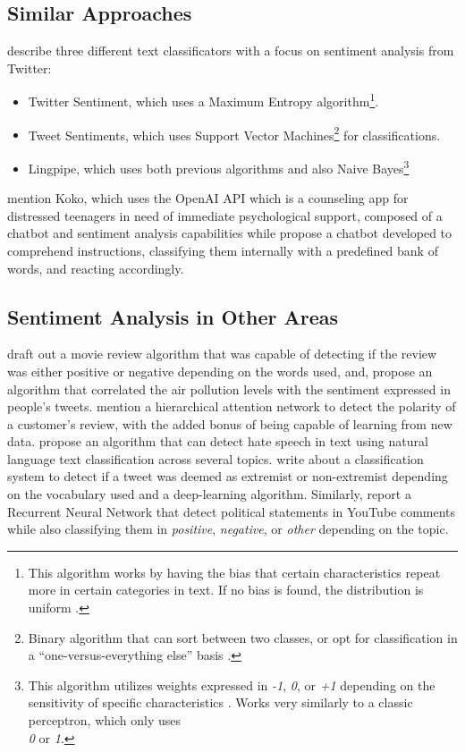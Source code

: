 \documentclass[review]{elsarticle} %
\begin{document}
\subsection{Similar Approaches}
\citet{rf10} describe three different text classificators with a focus on sentiment analysis from Twitter:\\ 
\begin{itemize}
\item Twitter Sentiment, which uses a Maximum Entropy algorithm\footnote{This algorithm works by having the bias that certain characteristics repeat more in certain categories in text. If no bias is found, the distribution is uniform \citep{rf17}.}.
\item Tweet Sentiments, which uses Support Vector Machines\footnote{Binary algorithm that can sort between two classes, or opt for classification in a ``one-versus-everything else'' basis \citep{rf18}.} for classifications.
\item Lingpipe, which uses both previous algorithms and also Naive Bayes\footnote{This algorithm utilizes weights expressed in \textit{-1}, \textit{0}, or \textit{+1} depending on the sensitivity of specific characteristics \citep{rf19}. Works very similarly to a classic perceptron, which only uses\\ \textit{0} or \textit{1}.}
\end{itemize}
\citet{rf6} mention Koko, which uses the OpenAI API which is a counseling app for distressed teenagers in need of immediate psychological support, composed of a chatbot and sentiment analysis capabilities while
\citet{rf14} propose a chatbot developed to comprehend instructions, classifying them internally with a predefined bank of words, and reacting accordingly.

\subsection{Sentiment Analysis in Other Areas}
\citet{rf5} draft out a movie review algorithm that was capable of detecting if the review was either positive or negative depending on the words used, and,
\citet{rf12} propose an algorithm that correlated the air pollution levels with the sentiment expressed in people's tweets.
\citet{rf13} mention a hierarchical attention network to detect the polarity of a customer's review, with the added bonus of being capable of learning from new data.
\citet{rf15} propose an algorithm that can detect hate speech in text using natural language text classification across several topics.
\citet{rf11} write about a classification system to detect if a tweet was deemed as extremist or non-extremist depending on the vocabulary used and a deep-learning algorithm. Similarly, \citet{rf16} report a Recurrent Neural Network that detect political statements in YouTube comments while also classifying them in \textit{positive}, \textit{negative}, or \textit{other} depending on the topic.
\end{document}
